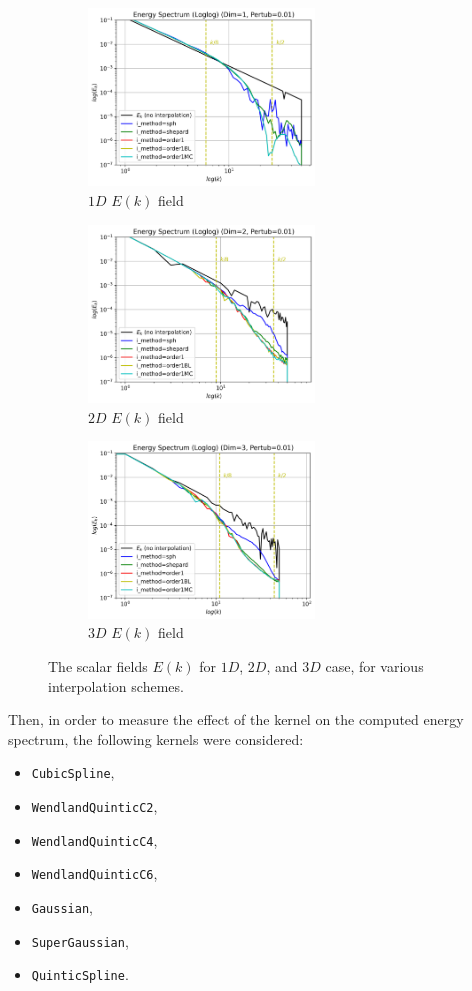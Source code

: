 \begin{figure}[htbp!]
	\begin{subfigure}{7cm}
		\centering\includegraphics[width=6cm]{Code-Figures/sin-vel-prof-i-methods/Energy Spectrum (Loglog) (Dim=1, Pertub=0.01).png}
		\caption{$1D$ $E(k)$ field}
	\end{subfigure}
	\begin{subfigure}{7cm}
		\centering\includegraphics[width=6cm]{Code-Figures/sin-vel-prof-i-methods/Energy Spectrum (Loglog) (Dim=2, Pertub=0.01).png}
		\caption{$2D$ $E(k)$ field}
	\end{subfigure}
	\begin{subfigure}{7cm}
		\centering\includegraphics[width=6cm]{Code-Figures/sin-vel-prof-i-methods/Energy Spectrum (Loglog) (Dim=3, Pertub=0.01).png}
		\caption{$3D$ $E(k)$ field}
	\end{subfigure}
	\caption{The scalar fields $E(k)$ for $1D$, $2D$, and $3D$ case, for various interpolation schemes.}
	\label{fig:espec-scalar-fields-i-methods}
\end{figure}

Then, in order to measure the effect of the kernel on the computed energy spectrum, the following kernels were considered:
\begin{itemize}
    \item \texttt{CubicSpline},
    \item \texttt{WendlandQuinticC2},
    \item \texttt{WendlandQuinticC4},
    \item \texttt{WendlandQuinticC6},
    \item \texttt{Gaussian},
    \item \texttt{SuperGaussian},
    \item \texttt{QuinticSpline}.
\end{itemize}


